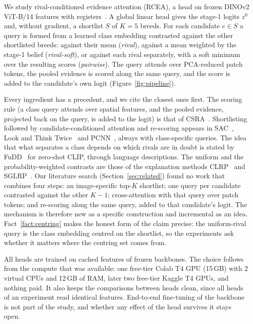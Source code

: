 \documentclass[11pt,a4paper]{article}
\theoremstyle{plain}
\begin{document}
We study rival-conditioned evidence attention (RCEA), a head on frozen DINOv2 ViT-B/14 features with
registers~\citep{oquab2024dinov2,darcet2024registers}. A global linear head gives the stage-1 logits $z^0$ and,
without gradient, a shortlist $S$ of $K=5$ breeds. For each candidate $c\in S$ a query is formed from a learned class
embedding contrasted against the other shortlisted breeds: against their mean (\emph{rival}), against a mean weighted
by the stage-1 belief (\emph{rival-soft}), or against each rival separately, with a soft minimum over the resulting
scores (\emph{pairwise}). The query attends over PCA-reduced patch tokens, the pooled evidence is scored along the
same query, and the score is added to the candidate's own logit (Figure~\ref{fig:pipeline}).

Every ingredient has a precedent, and we cite the closest ones first. The scoring rule (a class query attends over
spatial features, and the pooled evidence, projected back on the query, is added to the logit) is that of
CSRA~\citep{zhu2021csra}. Shortlisting followed by candidate-conditioned attention and re-scoring appears in
SAC~\citep{do2024sac}, Look and Think Twice~\citep{cao2015lookthink} and PCNN~\citep{nguyen2024pcnn}, always with
class-specific queries. The idea that what separates a class depends on which rivals are in doubt is stated by
FuDD~\citep{esfandiarpoor2024fudd} for zero-shot CLIP, through language descriptions. The uniform and the
probability-weighted contrasts are those of the explanation methods CLRP~\citep{gu2018clrp} and
SGLRP~\citep{iwana2019sglrp}. Our literature search (Section~\ref{sec:related}) found no work that combines four
steps: an image-specific top-$K$ shortlist; one query per candidate contrasted against the other $K-1$;
cross-attention with that query over patch tokens; and re-scoring along the same query, added to that candidate's
logit. The mechanism is therefore new as a specific construction and incremental as an idea.
Fact~\ref{fact:centring} makes the honest form of the claim precise: the uniform-rival query is the class embedding
centred on the shortlist, so the experiments ask whether it matters where the centring set comes from.

All heads are trained on cached features of frozen backbones. The choice follows from the compute that was
available: one free-tier Colab T4 GPU (15\,GB) with 2 virtual CPUs and 12\,GB of RAM, later two free-tier Kaggle T4
GPUs, and nothing paid. It also keeps
the comparisons between heads clean, since all heads of an experiment read identical features. End-to-end
fine-tuning of the backbone is not part of the study, and whether any effect of the head survives it stays open.
\end{document}
